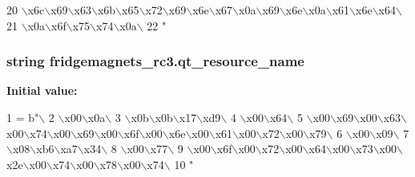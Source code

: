 \begin{DoxyCode}
20 \textcolor{stringliteral}{\(\backslash\)x6c\(\backslash\)x69\(\backslash\)x63\(\backslash\)x6b\(\backslash\)x65\(\backslash\)x72\(\backslash\)x69\(\backslash\)x6e\(\backslash\)x67\(\backslash\)x0a\(\backslash\)x69\(\backslash\)x6e\(\backslash\)x0a\(\backslash\)x61\(\backslash\)x6e\(\backslash\)x64\(\backslash\)}
21 \textcolor{stringliteral}{\(\backslash\)x0a\(\backslash\)x6f\(\backslash\)x75\(\backslash\)x74\(\backslash\)x0a\(\backslash\)}
22 \textcolor{stringliteral}{"}
\end{DoxyCode}
\hypertarget{namespacefridgemagnets__rc3_a70d2e0389489a3be6876ddebe4a4970d}{}
\subsubsection[{qt\+\_\+resource\+\_\+name}]{\setlength{\rightskip}{0pt plus 5cm}string fridgemagnets\+\_\+rc3.\+qt\+\_\+resource\+\_\+name}\label{namespacefridgemagnets__rc3_a70d2e0389489a3be6876ddebe4a4970d}
{\bfseries Initial value\+:}
\begin{DoxyCode}
1 = b\textcolor{stringliteral}{"\(\backslash\)}
2 \textcolor{stringliteral}{\(\backslash\)x00\(\backslash\)x0a\(\backslash\)}
3 \textcolor{stringliteral}{\(\backslash\)x0b\(\backslash\)x0b\(\backslash\)x17\(\backslash\)xd9\(\backslash\)}
4 \textcolor{stringliteral}{\(\backslash\)x00\(\backslash\)x64\(\backslash\)}
5 \textcolor{stringliteral}{\(\backslash\)x00\(\backslash\)x69\(\backslash\)x00\(\backslash\)x63\(\backslash\)x00\(\backslash\)x74\(\backslash\)x00\(\backslash\)x69\(\backslash\)x00\(\backslash\)x6f\(\backslash\)x00\(\backslash\)x6e\(\backslash\)x00\(\backslash\)x61\(\backslash\)x00\(\backslash\)x72\(\backslash\)x00\(\backslash\)x79\(\backslash\)}
6 \textcolor{stringliteral}{\(\backslash\)x00\(\backslash\)x09\(\backslash\)}
7 \textcolor{stringliteral}{\(\backslash\)x08\(\backslash\)xb6\(\backslash\)xa7\(\backslash\)x34\(\backslash\)}
8 \textcolor{stringliteral}{\(\backslash\)x00\(\backslash\)x77\(\backslash\)}
9 \textcolor{stringliteral}{\(\backslash\)x00\(\backslash\)x6f\(\backslash\)x00\(\backslash\)x72\(\backslash\)x00\(\backslash\)x64\(\backslash\)x00\(\backslash\)x73\(\backslash\)x00\(\backslash\)x2e\(\backslash\)x00\(\backslash\)x74\(\backslash\)x00\(\backslash\)x78\(\backslash\)x00\(\backslash\)x74\(\backslash\)}
10 \textcolor{stringliteral}{"}
\end{DoxyCode}
\hypertarget{namespacefridgemagnets__rc3_aa52bfccb9a33fe2d3a9fc5a556766c30}{}
